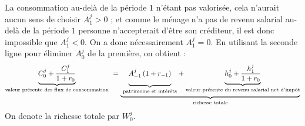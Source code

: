\documentclass[a4paper,11pt]{article}
\begin{document}
\begin{enumerate}
La consommation au-del\`{a} de la p\'{e}riode $1$ n'\'{e}tant pas
valoris\'{e}e, cela n'aurait aucun sens de choisir $A_{1}^{j}>0$ ; et
comme le m\'{e}nage n'a pas de revenu salarial au-del\`{a} de la p\'{e}riode 
$1$ personne n'accepterait d'\^{e}tre son cr\'{e}diteur, il est donc
impossible que $A_{1}^{j}<0$. On a donc n\'{e}cessairement $A_{1}^{j}=0$. En utilisant la seconde ligne pour \'{e}liminer $A^j_{0}$ de la premi\`{e}re,
on obtient :%
\begin{equation}
\underset{\text{valeur pr\'{e}sente des flux de consommation}}{\underbrace{C_{0}^{j} + \frac{C_{1}^{j}}{1+r_0}}}\ =\underset{\text{richesse totale}}{\underbrace{\ 
\underset{\text{patrimoine et int\'{e}r\^{e}ts}}{\underbrace{\underset{}{%
A_{-1}^{j}\left( 1+r_{-1}\right) }}}+\underset{\text{valeur pr\'{e}sente
du revenu salarial net d'imp\^{o}t}}{\underbrace{h_{0}^{j} + \frac{h_{1}^{j}}{1+r_0}}}}}  \label{2 - CBI}
\end{equation}
On denote la richesse totale par $W^j_0$. 

\end{enumerate}
\end{document}
